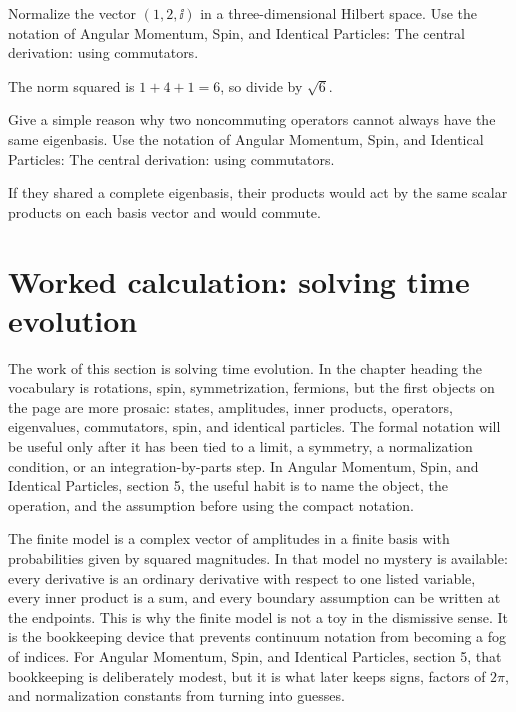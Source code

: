 \begin{exercise}
Normalize the vector \((1,2,\ii)\) in a three-dimensional Hilbert space.  Use the notation of Angular Momentum, Spin, and Identical Particles: The central derivation: using commutators.
\begin{answer}
The norm squared is \(1+4+1=6\), so divide by \(\sqrt6\).
\end{answer}
\end{exercise}

\begin{exercise}
Give a simple reason why two noncommuting operators cannot always have the same eigenbasis.  Use the notation of Angular Momentum, Spin, and Identical Particles: The central derivation: using commutators.
\begin{answer}
If they shared a complete eigenbasis, their products would act by the same scalar products on each basis vector and would commute.
\end{answer}
\end{exercise}



\section{Worked calculation: solving time evolution}

The work of this section is solving time evolution.  In the chapter heading the vocabulary is rotations, spin, symmetrization, fermions, but the first objects on the page are more prosaic: states, amplitudes, inner products, operators, eigenvalues, commutators, spin, and identical particles.  The formal notation will be useful only after it has been tied to a limit, a symmetry, a normalization condition, or an integration-by-parts step.  In Angular Momentum, Spin, and Identical Particles, section 5, the useful habit is to name the object, the operation, and the assumption before using the compact notation.

The finite model is a complex vector of amplitudes in a finite basis with probabilities given by squared magnitudes.  In that model no mystery is available: every derivative is an ordinary derivative with respect to one listed variable, every inner product is a sum, and every boundary assumption can be written at the endpoints.  This is why the finite model is not a toy in the dismissive sense.  It is the bookkeeping device that prevents continuum notation from becoming a fog of indices.  For Angular Momentum, Spin, and Identical Particles, section 5, that bookkeeping is deliberately modest, but it is what later keeps signs, factors of \(2\pi\), and normalization constants from turning into guesses.

